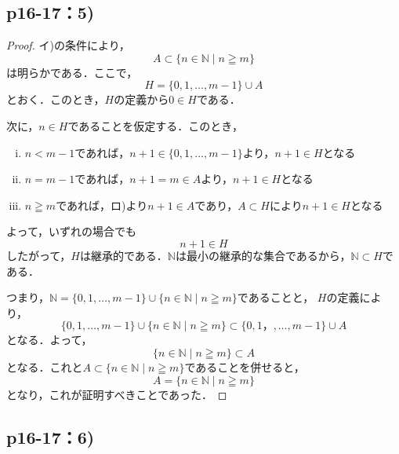 \documentclass[a4paper,10pt,fleqn]{ltjsarticle}
\begin{document}
\newpage 

\subsection*{p16-17：5)}

\begin{tleftbar}
	\begin{proof}
		イ)の条件により，
		\[ 
            A \subset \{n \in \mathbb{N} \mid n \geqq m\} 
        \]
		は明らかである．ここで，
		\[
        H=\{0,1,\dots,m-1\} \cup A
        \]
        とおく．このとき，$H$の定義から$0 \in H$である．

        次に，$n \in H$であることを仮定する．このとき，
        \begin{enumerate}[(i)]
        \item  $n<m-1$であれば，$n+1 \in \{0,1,\dots,m-1\}$より，$n+1 \in H$となる
		\item $n=m-1$であれば，$n+1=m \in A$より，$n+1 \in H$となる
		\item $n \geqq m$であれば，ロ)より$n+1 \in A$であり，$A \subset H $により$n + 1\in H$となる
		\end{enumerate}
		よって，いずれの場合でも
		\[
			n+1 \in H
		\]
		したがって，$H$は継承的である．$\mathbb{N}$は最小の継承的な集合であるから，$\mathbb{N} \subset H$である．

		つまり，$\mathbb{N} =  \{0,1,\dots,m-1\} \cup \{n \in \mathbb{N} \mid n \geqq m \}$であることと，
        $H$の定義により，
		\[
			 \{0,1,\dots,m-1\} \cup \{n \in \mathbb{N} \mid n \geqq m \} \subset \{0,1，,\dots,m-1\} \cup A
		\]
		となる．よって，
		\[
			\{n \in \mathbb{N}\mid n \geqq m \} \subset A
		\]
		となる．これと$ A \subset \{n \in \mathbb{N} \mid n \geqq m\}$であることを併せると，
		\[
			A=\{n \in \mathbb{N} \mid n \geqq m \}
		\]
        となり，これが証明すべきことであった．
	\end{proof}
\end{tleftbar}

\newpage 

\subsection*{p16-17：6)}

\end{document}
